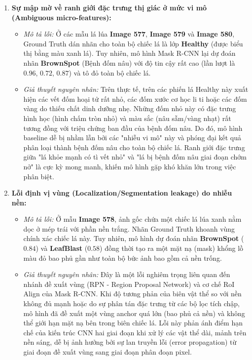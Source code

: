 \begin{enumerate}
    \item \textbf{Sự mập mờ về ranh giới đặc trưng thị giác ở mức vi mô (Ambiguous micro-features):}
          \begin{itemize}
              \item \textit{Mô tả lỗi:} Ở các mẫu lá lúa \textbf{Image 577}, \textbf{Image 579} và \textbf{Image 580}, Ground Truth dán nhãn cho toàn bộ chiếc lá là lớp \textbf{Healthy} (được biểu thị bằng màu xanh lá). Tuy nhiên, mô hình Mask R-CNN lại dự đoán nhãn \textbf{BrownSpot} (Bệnh đốm nâu) với độ tin cậy rất cao (lần lượt là $0.96$, $0.72$, $0.87$) và tô đỏ toàn bộ chiếc lá.
              \item \textit{Giả thuyết nguyên nhân:} Trên thực tế, trên các phiến lá Healthy này xuất hiện các vết đốm hoại tử rất nhỏ, các đốm xước cơ học li ti hoặc các đốm vàng do thiếu chất dinh dưỡng nhẹ. Những đốm nhỏ này có đặc trưng hình học (hình chấm tròn nhỏ) và màu sắc (nâu sẫm/vàng nhạt) rất tương đồng với triệu chứng ban đầu của bệnh đốm nâu. Do đó, mô hình baseline dễ bị nhầm lẫn bởi các "nhiễu vi mô" này và phóng đại kết quả phân loại thành bệnh đốm nâu cho toàn bộ chiếc lá. Ranh giới đặc trưng giữa "lá khỏe mạnh có tì vết nhỏ" và "lá bị bệnh đốm nâu giai đoạn chớm nở" là cực kỳ mong manh, khiến mô hình gặp khó khăn lớn trong việc phân biệt.
          \end{itemize}

    \item \textbf{Lỗi định vị vùng (Localization/Segmentation leakage) do nhiễu nền:}
          \begin{itemize}
              \item \textit{Mô tả lỗi:} Ở mẫu \textbf{Image 578}, ảnh gốc chứa một chiếc lá lúa xanh nằm dọc ở mép trái với phần nền trắng. Nhãn Ground Truth khoanh vùng chính xác chiếc lá này. Tuy nhiên, mô hình dự đoán nhãn \textbf{BrownSpot} ($0.84$) và \textbf{LeafBlast} ($0.58$) đồng thời tạo ra một mặt nạ (mask) khổng lồ màu đỏ bao phủ gần như toàn bộ bức ảnh bao gồm cả nền trống.
              \item \textit{Giả thuyết nguyên nhân:} Đây là một lỗi nghiêm trọng liên quan đến nhánh đề xuất vùng (RPN - Region Proposal Network) và cơ chế RoI Align của Mask R-CNN. Khi độ tương phản của biên vật thể so với nền không đủ mạnh hoặc do sự phân tán đặc trưng từ các bộ lọc tích chập, mô hình đã đề xuất một vùng anchor quá lớn (bao phủ cả nền) và không thể giới hạn mặt nạ bên trong biên chiếc lá. Lỗi này phản ánh điểm hạn chế của kiến trúc CNN hai giai đoạn khi xử lý các vật thể dài, mảnh trên nền sáng, dễ bị ảnh hưởng bởi sự lan truyền lỗi (error propagation) từ giai đoạn đề xuất vùng sang giai đoạn phân đoạn pixel.
          \end{itemize}
\end{enumerate}
